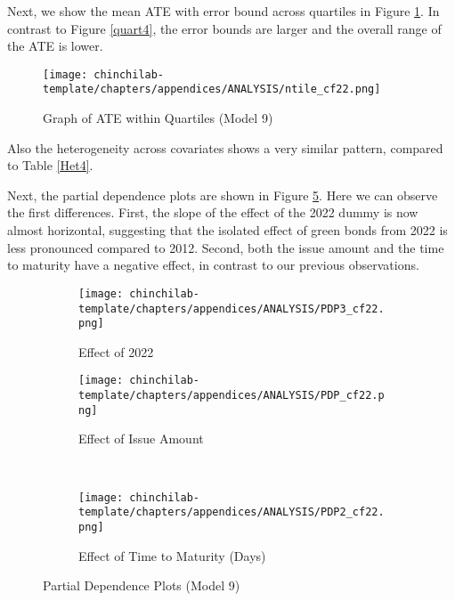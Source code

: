Next, we show the mean ATE with error bound across quartiles in Figure \ref{quart9}. In contrast to Figure \ref{quart4}, the error bounds are larger and the overall range of the ATE is lower.

\begin{figure}[H]
    \centering
    \texttt{[image: chinchilab-template/chapters/appendices/ANALYSIS/ntile\_cf22.png]}
    \caption{Graph of ATE within Quartiles (Model 9)}
    \label{quart9}
\end{figure}

Also the heterogeneity across covariates shows a very similar pattern, compared to Table \ref{Het4}.

Next, the partial dependence plots are shown in Figure \ref{pdp9}. Here we can observe the first differences. First, the slope of the effect of the 2022 dummy is now almost horizontal, suggesting that the isolated effect of green bonds from 2022 is less pronounced compared to 2012. Second, both the issue amount and the time to maturity have a negative effect, in contrast to our previous observations.

\begin{figure}[H]
\centering
   \begin{subfigure}[b]{0.45\textwidth} \centering
    \texttt{[image: chinchilab-template/chapters/appendices/ANALYSIS/PDP3\_cf22.png]}
    \caption{Effect of 2022}
   \label{fig:Ng1} 
\end{subfigure}
\begin{subfigure}[b]{0.5\textwidth} \centering
    \texttt{[image: chinchilab-template/chapters/appendices/ANALYSIS/PDP\_cf22.png]}
    \caption{Effect of Issue Amount}
   \label{fig:Ng2}
\end{subfigure}
\\
\begin{subfigure}[b]{0.5\textwidth} \centering
    \texttt{[image: chinchilab-template/chapters/appendices/ANALYSIS/PDP2\_cf22.png]}
    \caption{Effect of Time to Maturity (Days)}
   \label{fig:Ng2}
\end{subfigure}
\caption{Partial Dependence Plots (Model 9)}
\label{pdp9}
\end{figure}

